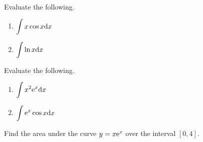 \newpage

\begin{example}
Evaluate the following.
\begin{enumerate}
\item $\displaystyle\int x\cos x\mathrm{d} x$
\vfill
\item $\displaystyle\int\ln x\mathrm{d} x$
\vfill
\end{enumerate}
\end{example}

\newpage

\begin{example}
Evaluate the following.
\begin{enumerate}
\item $\displaystyle\int x^2\mathrm{e}^x\mathrm{d} x$
\vfill
\item $\displaystyle\int\mathrm{e}^x\cos x\mathrm{d} x$
\vfill
\end{enumerate}
\end{example}

\newpage

\begin{example}
Find the area under the curve $y=x\mathrm{e}^x$ over the interval $[0,4]$.
\end{example}
